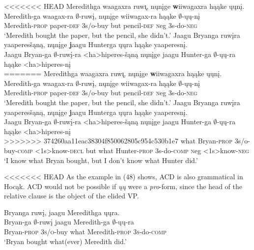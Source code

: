 \documentclass[output=paper]{LSP/langsci}
\begin{document}
\begin{exe}
\ex
\begin{xlist}
\ex
<<<<<<< HEAD
\glll Meredithga waagaxra ruw\k{\i}, nųnįge {\textbf wiiwagaxra} hąąke ųųnį.\\
Meredith-ga waagax-ra $\emptyset$-ruwį, nųnįge wiiwagax-ra hąąke $\emptyset$-ųų-nį\\
Meredith-\textsc{prop} paper-\textsc{def} {\textsc 3s/o}-buy but pencil-\textsc{def} {\textsc neg} {\textsc 3s}-do-\textsc{neg}\\
\trans `Meredith bought the paper, but the pencil, she didn't.'
\ex
\glll Jaagu Bryanga ruwįra yaaperesšąną, nųnįge {\textbf jaagu} Hunterga ųųra hąąke yaaperesnį.\\
Jaagu Bryan-ga $\emptyset$-ruwį-ra <ha>hiperes-šąną nųnįge jaagu Hunter-ga $\emptyset$-ųų-ra hąąke <ha>hiperes-nį\\
=======
\glll Meredithga waagaxra ruw\k{\i}, n\k{u}n\k{i}ge {\textbf wiiwagaxra} h\k{a}\k{a}ke \k{u}\k{u}n\k{i}.\\
Meredith-ga waagax-ra $\emptyset$-ruw\k{i}, n\k{u}n\k{i}ge wiiwagax-ra h\k{a}\k{a}ke $\emptyset$-\k{u}\k{u}-n\k{i}\\
Meredith-\textsc{prop} paper-\textsc{def} {\textsc 3s/o}-buy but pencil-\textsc{def} {\textsc neg} {\textsc 3s}-do-\textsc{neg}\\
\trans `Meredith bought the paper, but the pencil, she didn't.'
\ex
\glll Jaagu Bryanga ruw\k{i}ra yaaperes\v{s}\k{a}n\k{a}, n\k{u}n\k{i}ge {\textbf jaagu} Hunterga \k{u}\k{u}ra h\k{a}\k{a}ke yaaperesn\k{i}.\\
Jaagu Bryan-ga $\emptyset$-ruw\k{i}-ra <ha>hiperes-\v{s}\k{a}n\k{a} n\k{u}n\k{i}ge jaagu Hunter-ga $\emptyset$-\k{u}\k{u}-ra h\k{a}\k{a}ke <ha>hiperes-n\k{i}\\
>>>>>>> 374260aa11eac38304f850062805c954c530b1e7
what Bryan-\textsc{prop} {\textsc 3s/o}-buy-\textsc{comp} <{\textsc 1s}>know-\textsc{decl} but what Hunter-\textsc{prop} {\textsc 3s}-do-\textsc{comp} {\textsc neg} <{\textsc 1s}>know-\textsc{neg}\\
\trans `I know what Bryan bought, but I don't know what Hunter did.'
\end{xlist}
\end{exe}

<<<<<<< HEAD
As the example in (48) shows, ACD is also grammatical in Hocąk. ACD would not be possible if \emph{ųų} were a \emph{pro}-form, since the head of the relative clause is the object of the elided VP.

\begin{exe}
\ex
\glll Bryanga ruwį, jaagu Meredithga ųųra.\\
Bryan-ga $\emptyset$-ruwį jaagu Meredith-ga $\emptyset$-ųų-ra\\
Bryan-\textsc{prop} \textsc{3s/o}-buy what Meredith-\textsc{prop} \textsc{3s}-do-\textsc{comp}\\
\trans `Bryan bought what(ever) Meredith did.'
\end{exe}
\end{document}
